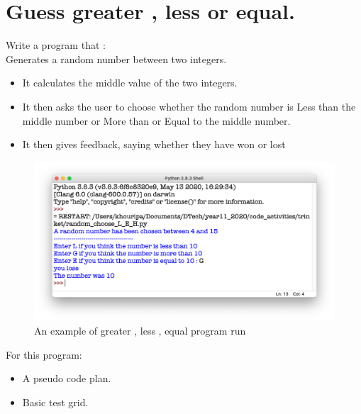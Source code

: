 \documentclass[a4paper,12pt]{article}
\begin{document}
\newpage

\section{Guess greater , less or equal.}

Write a program that :\\
Generates a random number between two integers.
\begin{itemize}
	\item It calculates the middle value of the two integers.
	\item It then asks the user to choose whether the random  number is Less than the middle number or More than or Equal to the middle number.
	\item It then gives feedback, saying whether they have won or lost
\end{itemize}

\begin{figure} [!h]
	\centering
	\includegraphics[width=13cm]{screen_shots/random_choose_L_E_H.png}
	\caption*{An example of greater , less , equal  program run}
\end{figure}

For this program:
\begin{itemize}
	\item A pseudo code plan.
	\item Basic test grid.
\end{itemize}
\newpage
\end{document}
